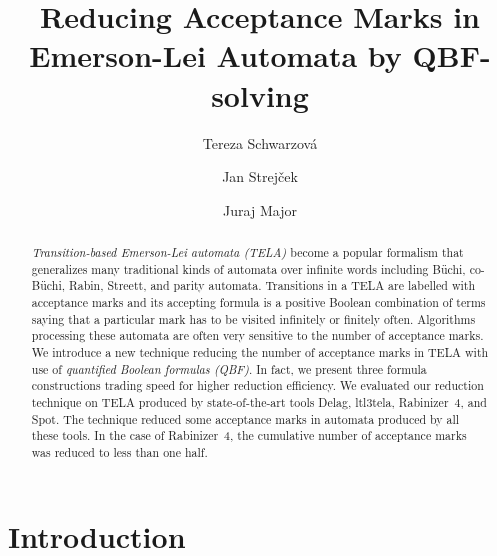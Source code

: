 \documentclass[a4paper,UKenglish,cleveref, autoref, thm-restate]{lipics-v2021}
\title{Reducing Acceptance Marks in Emerson-Lei Automata by QBF-solving}
\author{Tereza Schwarzov\'{a}}{Faculty of Informatics, Masaryk University, Brno, Czech Republic}{xschwar3@mail.muni.cz}{}{}
\author{Jan Strej\v{c}ek}{Faculty of Informatics, Masaryk University, Brno, Czech Republic}{strejcek@fi.muni.cz}{https://orcid.org/0000-0001-5873-403X}{}
\author{Juraj Major}{Faculty of Informatics, Masaryk University, Brno, Czech Republic}{major@fi.muni.cz}{}{}
\begin{document}
\maketitle


\begin{abstract}
  \emph{Transition-based Emerson-Lei automata (TELA)} become a popular
  formalism that generalizes many traditional kinds of automata over
  infinite words including Büchi, co-Büchi, Rabin, Streett, and parity
  automata. Transitions in a TELA are labelled with acceptance marks
  and its accepting formula is a positive Boolean combination of terms
  saying that a particular mark has to be visited infinitely or
  finitely often. %
  Algorithms processing these automata are often very sensitive to the
  number of %
  acceptance marks. We introduce a new technique reducing the number
  of %
  acceptance marks in TELA with use of \emph{quantified Boolean
    formulas (QBF)}.
  In fact, we present three formula constructions
  trading speed for higher reduction
  efficiency. We evaluated our reduction technique on TELA produced by
  state-of-the-art tools Delag, ltl3tela, Rabinizer~4, and Spot. The
  technique reduced some acceptance marks in automata produced by all
  these tools. In the case of Rabinizer~4, the cumulative number of
  acceptance marks was reduced to less than one half.
\end{abstract}



\section{Introduction}

\end{document}
